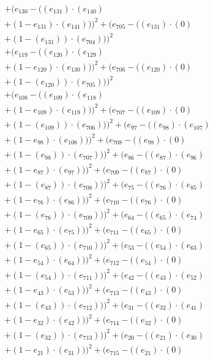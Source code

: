 \documentclass[10pt, a4paper]{article}
\begin{document}
\begin{align*}
& + (e_{130} - ((e_{131})  \cdot  (e_{140}) \\
& + (1 - e_{131})  \cdot  (e_{141})))^{2} + (e_{705} - ((e_{131}) \cdot (0) \\
& + (1 - (e_{131})) \cdot (e_{704})))^{2} \\
& + (e_{119} - ((e_{120})  \cdot  (e_{129}) \\
& + (1 - e_{120})  \cdot  (e_{130})))^{2} + (e_{706} - ((e_{120}) \cdot (0) \\
& + (1 - (e_{120})) \cdot (e_{705})))^{2} \\
& + (e_{108} - ((e_{109})  \cdot  (e_{118}) \\
& + (1 - e_{109})  \cdot  (e_{119})))^{2} + (e_{707} - ((e_{109}) \cdot (0) \\
& + (1 - (e_{109})) \cdot (e_{706})))^{2} + (e_{97} - ((e_{98})  \cdot  (e_{107}) \\
& + (1 - e_{98})  \cdot  (e_{108})))^{2} + (e_{708} - ((e_{98}) \cdot (0) \\
& + (1 - (e_{98})) \cdot (e_{707})))^{2} + (e_{86} - ((e_{87})  \cdot  (e_{96}) \\
& + (1 - e_{87})  \cdot  (e_{97})))^{2} + (e_{709} - ((e_{87}) \cdot (0) \\
& + (1 - (e_{87})) \cdot (e_{708})))^{2} + (e_{75} - ((e_{76})  \cdot  (e_{85}) \\
& + (1 - e_{76})  \cdot  (e_{86})))^{2} + (e_{710} - ((e_{76}) \cdot (0) \\
& + (1 - (e_{76})) \cdot (e_{709})))^{2} + (e_{64} - ((e_{65})  \cdot  (e_{74}) \\
& + (1 - e_{65})  \cdot  (e_{75})))^{2} + (e_{711} - ((e_{65}) \cdot (0) \\
& + (1 - (e_{65})) \cdot (e_{710})))^{2} + (e_{53} - ((e_{54})  \cdot  (e_{63}) \\
& + (1 - e_{54})  \cdot  (e_{64})))^{2} + (e_{712} - ((e_{54}) \cdot (0) \\
& + (1 - (e_{54})) \cdot (e_{711})))^{2} + (e_{42} - ((e_{43})  \cdot  (e_{52}) \\
& + (1 - e_{43})  \cdot  (e_{53})))^{2} + (e_{713} - ((e_{43}) \cdot (0) \\
& + (1 - (e_{43})) \cdot (e_{712})))^{2} + (e_{31} - ((e_{32})  \cdot  (e_{41}) \\
& + (1 - e_{32})  \cdot  (e_{42})))^{2} + (e_{714} - ((e_{32}) \cdot (0) \\
& + (1 - (e_{32})) \cdot (e_{713})))^{2} + (e_{20} - ((e_{21})  \cdot  (e_{30}) \\
& + (1 - e_{21})  \cdot  (e_{31})))^{2} + (e_{715} - ((e_{21}) \cdot (0) \\

\end{align*}
\end{document}
